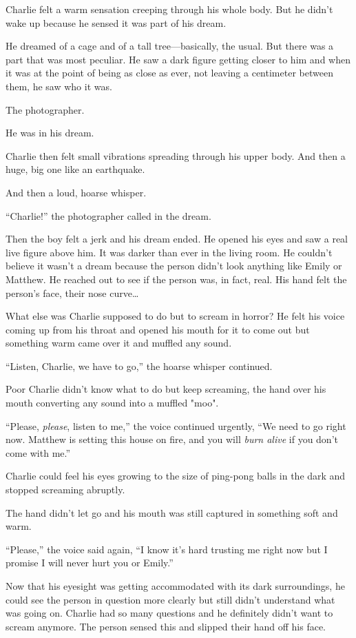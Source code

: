 Charlie felt a warm sensation creeping through his whole body. But he didn't wake up because he sensed it was part of his dream.

He dreamed of a cage and of a tall tree—basically, the usual. But there was a part that was most peculiar. He saw a dark figure getting closer to him and when it was at the point of being as close as ever, not leaving a centimeter between them, he saw who it was.

The photographer.

He was in his dream.

Charlie then felt small vibrations spreading through his upper body. And then a huge, big one like an earthquake.

And then a loud, hoarse whisper.

“Charlie!” the photographer called in the dream.

Then the boy felt a jerk and his dream ended. He opened his eyes and saw a real live figure above him. It was darker than ever in the living room. He couldn't believe it wasn't a dream because the person didn't look anything like Emily or Matthew. He reached out to see if the person was, in fact, real. His hand felt the person's face, their nose curve…

What else was Charlie supposed to do but to scream in horror? He felt his voice coming up from his throat and opened his mouth for it to come out but something warm came over it and muffled any sound.

“Listen, Charlie, we have to go,” the hoarse whisper continued.

Poor Charlie didn't know what to do but keep screaming, the hand over his mouth converting any sound into a muffled "moo".

“Please, \textit{please}, listen to me,” the voice continued urgently, “We need to go right now. Matthew is setting this house on fire, and you will \textit{burn alive} if you don't come with me.”

Charlie could feel his eyes growing to the size of ping-pong balls in the dark and stopped screaming abruptly.

The hand didn't let go and his mouth was still captured in something soft and warm.

“Please,” the voice said again, “I know it's hard trusting me right now but I promise I will never hurt you or Emily.”

Now that his eyesight was getting accommodated with its dark surroundings, he could see the person in question more clearly but still didn't understand what was going on. Charlie had so many questions and he definitely didn't want to scream anymore. The person sensed this and slipped their hand off his face.

